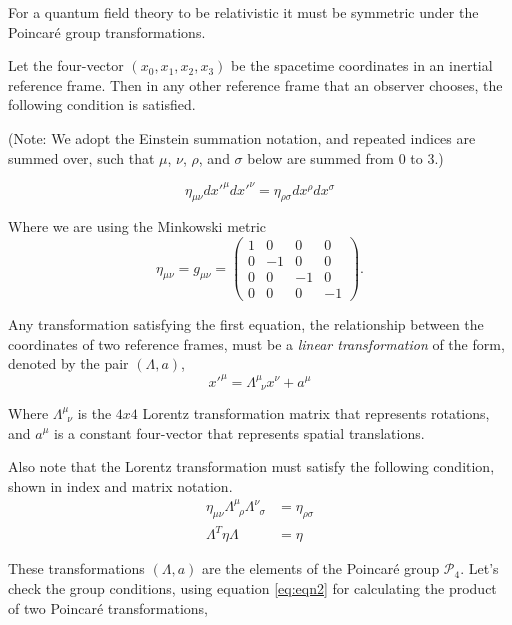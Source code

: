 For a quantum field theory to be relativistic it must be symmetric under the Poincar\'e group transformations.

\noindent Let the four-vector $(x_0, x_1, x_2, x_3)$ be the spacetime coordinates in an inertial reference frame. Then in any other reference frame that an observer chooses, the following condition is satisfied. 

\noindent (Note: We adopt the Einstein summation notation, and repeated indices are summed over, such that $\mu$, $\nu$, $\rho$, and $\sigma$ below are summed from $0$ to $3$.)

\begin{equation}
\eta_{\mu\nu} dx'^\mu dx'^\nu = \eta_{\rho\sigma} dx^\rho dx^\sigma
\end{equation}

\noindent Where we are using the Minkowski metric
\begin{equation}
\eta_{\mu\nu} 
= g_{\mu\nu} 
= \left( \begin{array}{rrrr} 
1 & 0 & 0 & 0 \\ 
0 & -1 & 0 & 0 \\ 
0 & 0 & -1 & 0 \\ 
0 & 0 & 0 & -1 
\end{array} \right)
.
\end{equation}

\noindent Any transformation satisfying the first equation, the relationship between the coordinates of two reference frames, must be a \textit{linear transformation} of the form, denoted by the pair $(\Lambda, a)$,
\begin{equation}
x'^\mu = \Lambda^\mu_{\,\,\,\nu} x^\nu + a^\mu
\end{equation}

\noindent Where $\Lambda^\mu_{\,\,\,\nu}$ is the $4x4$ Lorentz transformation matrix that represents rotations, and $a^\mu$ is a constant four-vector that represents spatial translations. 

\noindent Also note that the Lorentz transformation must satisfy the following condition, shown in index and matrix notation.
\begin{align}
	\eta_{\mu\nu} \Lambda^\mu_{\,\,\,\rho} \Lambda^\nu_{\,\,\,\sigma} &= \eta_{\rho\sigma} \\
	\Lambda^{T} \eta \Lambda &= \eta
\end{align}

\noindent These transformations $(\Lambda, a)$ are the elements of the Poincar\'e group $\mathcal{P}_4$. Let's check the group conditions, using equation \eqref{eq:eqn2} for calculating the product of two Poincar\'e transformations,

